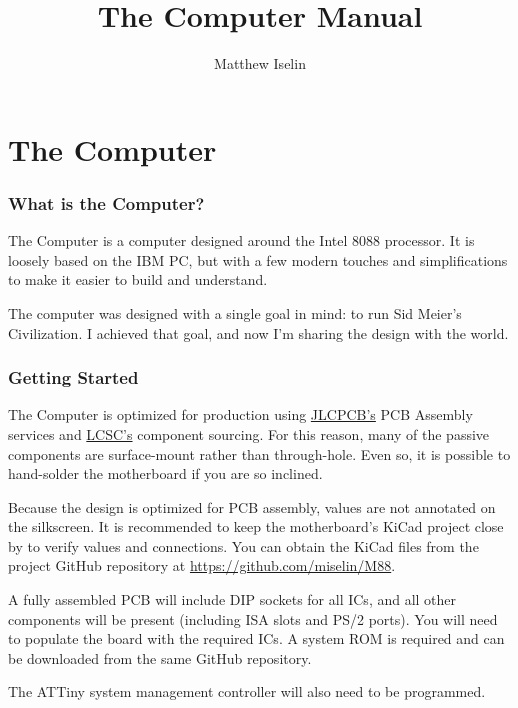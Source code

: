 \documentclass[twoside,10pt,letterpaper]{refart}
\title{The \m88 Computer Manual}
\author{Matthew Iselin}
\date{}
\begin{document}
\maketitle
\raggedright
\footnotesize

\tableofcontents

\newpage

\part{The  Computer}

\section{What is the  Computer?}
The  Computer is a computer designed around the Intel 8088 processor.
It is loosely based on the IBM PC, but with a few modern touches and simplifications
to make it easier to build and understand.

The computer was designed with a single goal in mind: to run Sid Meier's Civilization.
I achieved that goal, and now I'm sharing the design with the world.

\section{Getting Started}
The  Computer is optimized for production using \href{https://jlcpcb.com}{JLCPCB's}
PCB Assembly services and \href{https://lcsc.com}{LCSC's} component sourcing. For this reason,
many of the passive components are surface-mount rather than through-hole. Even so, it is
possible to hand-solder the motherboard if you are so inclined.

Because the design is optimized for PCB assembly, values are not annotated on the silkscreen.
It is recommended to keep the motherboard's KiCad project close by to verify values and connections.
You can obtain the KiCad files from the project GitHub repository at \url{https://github.com/miselin/M88}.

A fully assembled PCB will include DIP sockets for all ICs, and all other components will be
present (including ISA slots and PS/2 ports). You will need to populate the board with the
required ICs. A system ROM is required and can be downloaded from the same GitHub repository.

The ATTiny system management controller will also need to be programmed.
\end{document}
